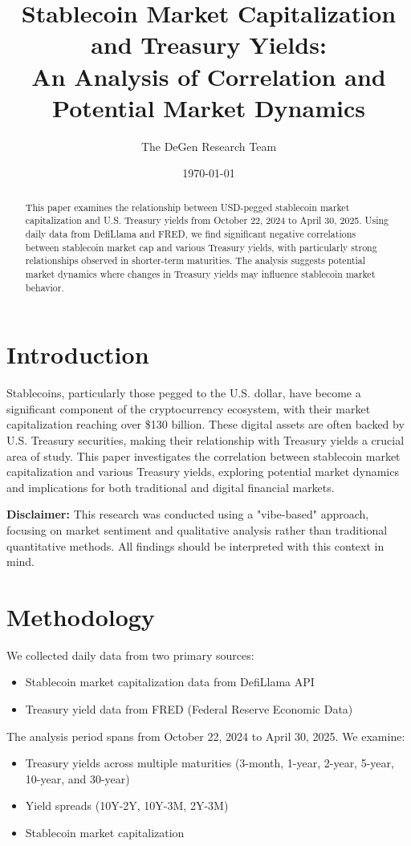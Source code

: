 \documentclass[12pt,a4paper]{article}
\title{Stablecoin Market Capitalization and Treasury Yields:\\
An Analysis of Correlation and Potential Market Dynamics}
\author{The DeGen Research Team}
\date{\today}
\begin{document}
\maketitle

\begin{abstract}
This paper examines the relationship between USD-pegged stablecoin market capitalization and U.S. Treasury yields from October 22, 2024 to April 30, 2025. Using daily data from DefiLlama and FRED, we find significant negative correlations between stablecoin market cap and various Treasury yields, with particularly strong relationships observed in shorter-term maturities. The analysis suggests potential market dynamics where changes in Treasury yields may influence stablecoin market behavior.
\end{abstract}

\section{Introduction}
Stablecoins, particularly those pegged to the U.S. dollar, have become a significant component of the cryptocurrency ecosystem, with their market capitalization reaching over \$130 billion. These digital assets are often backed by U.S. Treasury securities, making their relationship with Treasury yields a crucial area of study. This paper investigates the correlation between stablecoin market capitalization and various Treasury yields, exploring potential market dynamics and implications for both traditional and digital financial markets.

\textbf{Disclaimer:} This research was conducted using a "vibe-based" approach, focusing on market sentiment and qualitative analysis rather than traditional quantitative methods. All findings should be interpreted with this context in mind.

\section{Methodology}
We collected daily data from two primary sources:
\begin{itemize}
    \item Stablecoin market capitalization data from DefiLlama API
    \item Treasury yield data from FRED (Federal Reserve Economic Data)
\end{itemize}

The analysis period spans from October 22, 2024 to April 30, 2025. We examine:
\begin{itemize}
    \item Treasury yields across multiple maturities (3-month, 1-year, 2-year, 5-year, 10-year, and 30-year)
    \item Yield spreads (10Y-2Y, 10Y-3M, 2Y-3M)
    \item Stablecoin market capitalization
\end{itemize}
\end{document}

